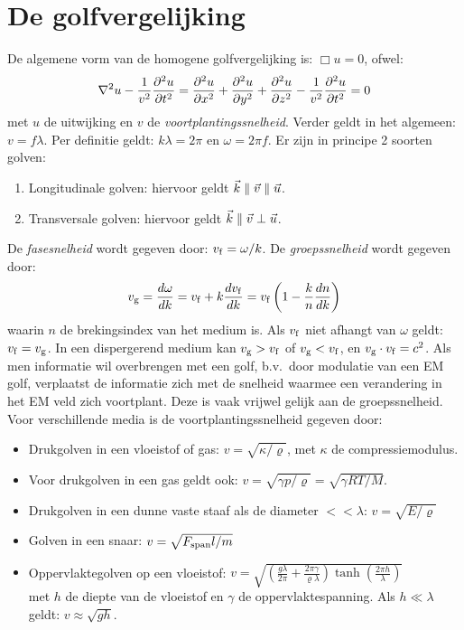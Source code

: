 \section{De golfvergelijking}
De algemene vorm van de homogene golfvergelijking is: $\Box u=0$, ofwel:
\[
\nabla^2u-\frac{1}{v^2}\frac{\partial^2 u}{\partial t^2}=\frac{\partial^2 u}{\partial x^2}+\frac{\partial^2 u}{\partial y^2}+\frac{\partial^2 u}{\partial z^2}-\frac{1}{v^2}\frac{\partial^2 u}{\partial t^2}=0
\]
met $u$ de uitwijking en $v$ de {\it voortplantingssnelheid}. Verder geldt in
het algemeen: $v=f\lambda$. Per definitie geldt: $k\lambda=2\pi$ en
$\omega=2\pi f$.
\npar
Er zijn in principe 2 soorten golven:
\begin{enumerate}
\item Longitudinale golven: hiervoor geldt $\vec{k}\parallel\vec{v}\parallel\vec{u}$.
\item Transversale golven: hiervoor geldt $\vec{k}\parallel\vec{v}\perp\vec{u}$.
\end{enumerate}
De {\it fasesnelheid} wordt gegeven door: $v_{\rm f}=\omega/k$. De
{\it groepssnelheid} wordt gegeven door:
\[
v_{\rm g}=\frac{d\omega}{dk}=v_{\rm f}+k\frac{dv_{\rm f}}{dk}=
v_{\rm f}\left(1-\frac{k}{n}\frac{dn}{dk}\right)
\]
waarin $n$ de brekingsindex van het medium is. Als $v_{\rm f}$ niet afhangt
van $\omega$ geldt: $v_{\rm f}=v_{\rm g}$. In een dispergerend medium kan
$v_{\rm g}>v_{\rm f}$ of $v_{\rm g}<v_{\rm f}$, en $v_{\rm g}\cdot v_{\rm f}=c^2$.
Als men informatie wil overbrengen met een golf, b.v.\ door modulatie van een
EM golf, verplaatst de informatie zich met de snelheid waarmee een
verandering in het EM veld zich voortplant. Deze is vaak vrijwel gelijk aan
de groepssnelheid.
\npar
Voor verschillende media is de voortplantingssnelheid gegeven door:
\begin{itemize}
\item Drukgolven in een vloeistof of gas: $v=\sqrt{\kappa/\varrho}$, met
      $\kappa$ de compressiemodulus.
\item Voor drukgolven in een gas geldt ook: $v=\sqrt{\gamma p/\varrho}=\sqrt{\gamma RT/M}$.
\item Drukgolven in een dunne vaste staaf als de diameter $<<\lambda$: $v=\sqrt{E/\varrho}$
\item Golven in een snaar: $v=\sqrt{F_{\rm span}l/m}$
\item Oppervlaktegolven op een vloeistof: $\displaystyle v=
      \sqrt{\left(\frac{g\lambda}{2\pi}+\frac{2\pi\gamma}{\varrho\lambda}\right)
      \tanh\left(\frac{2\pi h}{\lambda}\right)}$\\
      met $h$ de diepte van de vloeistof en $\gamma$ de oppervlaktespanning.
      Als $h\ll\lambda$ geldt: $v\approx\sqrt{gh}$.
\end{itemize}

